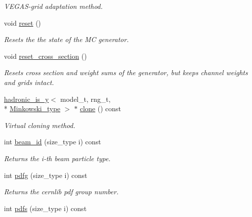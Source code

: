 \begin{DoxyCompactItemize}
\begin{DoxyCompactList}\small\item\em V\-E\-G\-A\-S-\/grid adaptation method. \end{DoxyCompactList}\item 
void \hyperlink{a00259_a0b504d75eb09425456b2d27af5f2c71b}{reset} ()
\begin{DoxyCompactList}\small\item\em Resets the the state of the M\-C generator. \end{DoxyCompactList}\item 
void \hyperlink{a00259_a297a807339f2752c8cedaadf07a197d2}{reset\-\_\-cross\-\_\-section} ()
\begin{DoxyCompactList}\small\item\em Resets cross section and weight sums of the generator, but keeps channel weights and grids intact. \end{DoxyCompactList}\item 
\hypertarget{a00259_a2aa3b526cc526742df0ac5159788e1a1}{\hyperlink{a00258}{hadronic\-\_\-is\-\_\-y}$<$ model\-\_\-t, rng\-\_\-t, \\*
\hyperlink{a00369}{Minkowski\-\_\-type} $>$ $\ast$ \hyperlink{a00259_a2aa3b526cc526742df0ac5159788e1a1}{clone} () const }\label{a00259_a2aa3b526cc526742df0ac5159788e1a1}

\begin{DoxyCompactList}\small\item\em Virtual cloning method. \end{DoxyCompactList}\item 
\hypertarget{a00259_a77ab576fbb1779f2247caa69597b5b94}{int \hyperlink{a00259_a77ab576fbb1779f2247caa69597b5b94}{beam\-\_\-id} (size\-\_\-type i) const }\label{a00259_a77ab576fbb1779f2247caa69597b5b94}

\begin{DoxyCompactList}\small\item\em Returns the i-\/th beam particle type. \end{DoxyCompactList}\item 
\hypertarget{a00259_a4d73ff387bd178cac4b0e41e64c63236}{int \hyperlink{a00259_a4d73ff387bd178cac4b0e41e64c63236}{pdfg} (size\-\_\-type i) const }\label{a00259_a4d73ff387bd178cac4b0e41e64c63236}

\begin{DoxyCompactList}\small\item\em Returns the cernlib pdf group number. \end{DoxyCompactList}\item 
\hypertarget{a00259_a2d4c104dbb41559ee91885ddd929486f}{int \hyperlink{a00259_a2d4c104dbb41559ee91885ddd929486f}{pdfs} (size\-\_\-type i) const }\label{a00259_a2d4c104dbb41559ee91885ddd929486f}


\end{DoxyCompactItemize}
